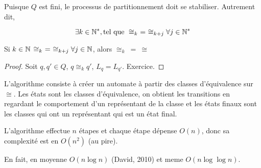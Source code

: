 \begin{remarque}
	Puisque $Q$ est fini, le processus de partitionnement doit se stabiliser. Autrement dit,

	$$\exists k \in \mathbb{N}^*, \text{tel que } \cong_{k} \ = \ \cong_{k+j} \forall j \in \mathbb{N}^* $$
\end{remarque}


\begin{prop}
	Si $k \in \mathbb{N}$ \tq $ \cong_k \ = \ \cong_{k+j} \forall j \in \mathbb{N}$, alors $\cong_k \ = \ \cong$
\end{prop}

\begin{proof}
	Soit $q,q' \in Q$, $q \cong_k q'$, \mq $L_q = L_{q'}$. Exercice.
\end{proof}

\begin{definition}
	L'algorithme consiste à créer un automate à partir des classes d'équivalence sur $\cong$.
	Les états sont les classes d'équivalence, on obtient les transitions en regardant le comportement
	d'un représentant de la classe et les états finaux sont les classes qui ont un représentant qui est un état final.
\end{definition}


\begin{complexite}
	L'algorithme effectue $n$ étapes et chaque étape dépense $O(n)$, donc sa complexité est en $O(n^2)$ (au pire).

	En fait, en moyenne $O(n \log n)$ (David, 2010) et meme $O(n \log \log n)$.
\end{complexite}


